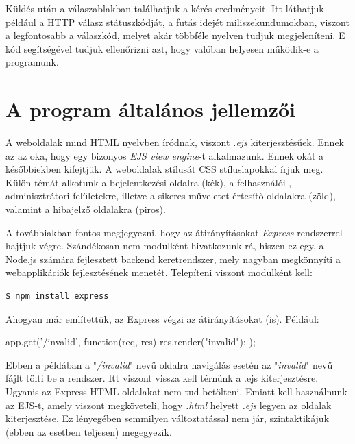 Küldés után a válaszablakban találhatjuk a kérés eredményeit. Itt láthatjuk például a HTTP válasz státuszkódját, a futás idejét miliszekundumokban, viszont a legfontosabb a válaszkód, melyet akár többféle nyelven tudjuk megjeleníteni. E kód segítségével tudjuk ellenőrizni azt, hogy valóban helyesen működik-e a programunk.


\section{A program általános jellemzői}

A weboldalak mind HTML nyelvben íródnak, viszont \textit{.ejs} kiterjesztésűek. Ennek az az oka, hogy egy bizonyos \textit{EJS view engine}-t alkalmazunk. Ennek okát a későbbiekben kifejtjük. A weboldalak stílusát CSS stíluslapokkal írjuk meg. Külön témát alkotunk a bejelentkezési oldalra (kék), a felhasználói-, adminisztrátori felületekre, illetve a sikeres műveletet értesítő oldalakra (zöld), valamint a hibajelző oldalakra (piros).

A továbbiakban fontos megjegyezni, hogy az átirányításokat \textit{Express} rendszerrel hajtjuk végre. Szándékosan nem modulként hivatkozunk rá, hiszen ez egy, a Node.js számára fejlesztett backend keretrendszer, mely nagyban megkönnyíti a webapplikációk fejlesztésének menetét. Telepíteni viszont modulként kell:

\begin{verbatim}
$ npm install express
\end{verbatim}

Ahogyan már említettük, az Express végzi az átirányításokat (is). Például:

\begin{javascript}
app.get('/invalid', function(req, res) {
  res.render("invalid");
});
\end{javascript}

Ebben a példában a "\textit{/invalid}" nevű oldalra navigálás esetén az "\textit{invalid}" nevű fájlt tölti be a rendszer. Itt viszont vissza kell térnünk a .ejs kiterjesztésre. Ugyanis az Express HTML oldalakat nem tud betölteni. Emiatt kell használnunk az EJS-t, amely viszont megköveteli, hogy \textit{.html} helyett \textit{.ejs} legyen az oldalak kiterjesztése. Ez lényegében semmilyen változtatással nem jár, szintaktikájuk (ebben az esetben teljesen) megegyezik.

